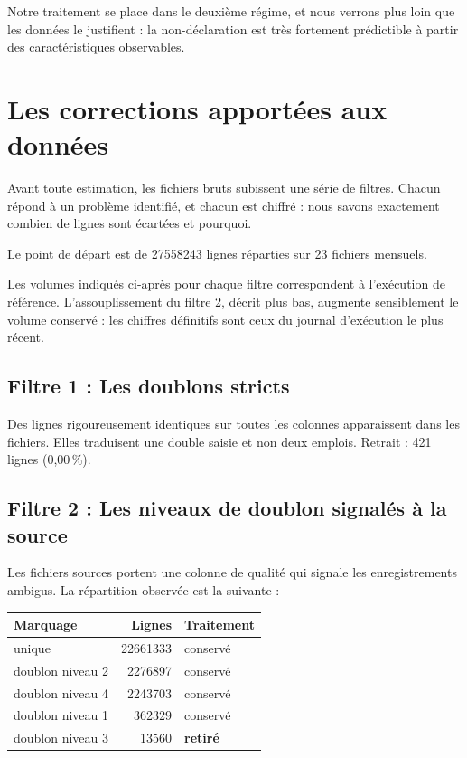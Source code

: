 \documentclass[11pt,a4paper]{article}
\begin{document}
Notre traitement se place dans le deuxième régime, et nous verrons plus
loin que les données le justifient : la non-déclaration est très
fortement prédictible à partir des caractéristiques observables.

\section{Les corrections apportées aux données}

Avant toute estimation, les fichiers bruts subissent une série de
filtres. Chacun répond à un problème identifié, et chacun est chiffré :
nous savons exactement combien de lignes sont écartées et pourquoi.

Le point de départ est de \num{27558243} lignes réparties sur 23 fichiers
mensuels.

Les volumes indiqués ci-après pour chaque filtre correspondent à
l'exécution de référence. L'assouplissement du filtre 2, décrit plus bas,
augmente sensiblement le volume conservé : les chiffres définitifs sont
ceux du journal d'exécution le plus récent.

\subsection{Filtre 1 : Les doublons stricts}

Des lignes rigoureusement identiques sur toutes les colonnes apparaissent
dans les fichiers. Elles traduisent une double saisie et non deux
emplois. Retrait : \num{421} lignes (0,00\,\%).

\subsection{Filtre 2 : Les niveaux de doublon signalés à la source}

Les fichiers sources portent une colonne de qualité qui signale les
enregistrements ambigus. La répartition observée est la suivante :

\begin{center}
\begin{tabular}{lrl}
\toprule
\textbf{Marquage} & \textbf{Lignes} & \textbf{Traitement} \\
\midrule
unique & \num{22661333} & conservé \\
doublon niveau 2 & \num{2276897} & conservé \\
doublon niveau 4 & \num{2243703} & conservé \\
doublon niveau 1 & \num{362329} & conservé \\
doublon niveau 3 & \num{13560} & \textbf{retiré} \\
\bottomrule
\end{tabular}
\end{center}
\end{document}
